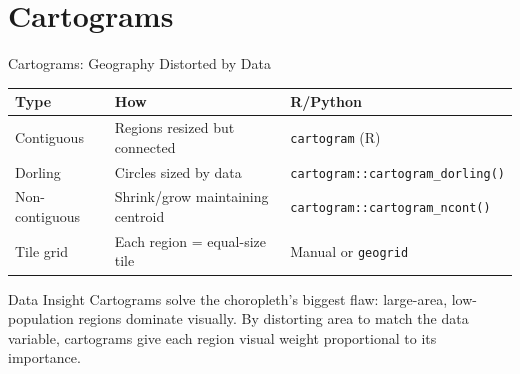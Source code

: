 \documentclass[10pt]{beamer}
\begin{document}
\section{Cartograms}
\begin{frame}{Cartograms: Geography Distorted by Data}
\centering
\begin{tabular}{lp{4.5cm}l}
\toprule
\textbf{Type} & \textbf{How} & \textbf{R/Python} \\
\midrule
Contiguous & Regions resized but connected & \texttt{cartogram} (R) \\
Dorling & Circles sized by data & \texttt{cartogram::cartogram\_dorling()} \\
Non-contiguous & Shrink/grow maintaining centroid & \texttt{cartogram::cartogram\_ncont()} \\
Tile grid & Each region = equal-size tile & Manual or \texttt{geogrid} \\
\bottomrule
\end{tabular}
\vspace{6pt}
\begin{exampleblock}{Data Insight}
Cartograms solve the choropleth's biggest flaw: large-area, low-population regions dominate visually. By distorting area to match the data variable, cartograms give each region visual weight proportional to its importance.
\end{exampleblock}
\end{frame}
\end{document}
